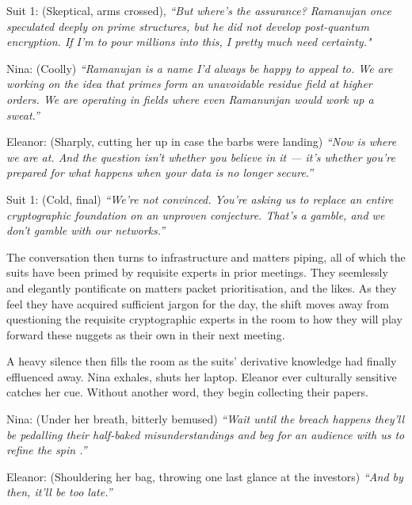 \smallskip

Suit 1: (Skeptical, arms crossed), \textit{“But where’s the \textit{assurance}? Ramanujan once speculated deeply on prime structures, but he did not develop post-quantum encryption. If I’m to pour millions into this, I pretty much need certainty."}

\smallskip

Nina: (Coolly) \textit{“Ramanujan is a name I’d always be happy to appeal to. We are working on the idea that primes form an unavoidable residue field at higher orders. We are operating in fields where even Ramanunjan would work up a sweat.”}

\smallskip

Eleanor: (Sharply, cutting her up in case the barbs were landing)\textit{ “Now is where we are at. And the question isn’t whether you believe in it — it’s whether you’re prepared for what happens when your data is no longer secure.”}

\smallskip

Suit 1: (Cold, final) \textit{“We’re not convinced. You’re asking us to replace an entire cryptographic foundation on an unproven conjecture. That’s a gamble, and we don’t gamble with our networks.”}

\smallskip

The conversation then  turns to infrastructure and matters piping, all of which the suits have been primed by requisite experts in prior meetings. They seemlessly and elegantly pontificate on matters packet prioritisation, and the likes. As they feel they have acquired sufficient jargon for the day, the shift moves away from questioning the requisite cryptographic experts in the room to how they will play forward these nuggets as their own in their next meeting.

\smallskip

\noindent A heavy silence then fills the room as the suits' derivative knowledge had finally effluenced away. Nina exhales, shuts her laptop. Eleanor ever culturally sensitive catches her cue. Without another word, they begin collecting their papers.

\smallskip

Nina: (Under her breath, bitterly bemused) \textit{“Wait until the breach happens they’ll be pedalling their half-baked misunderstandings and beg for an audience with us to refine the spin .”}

\smallskip

Eleanor: (Shouldering her bag, throwing one last glance at the investors) \textit{“And by then, it’ll be too late.”}

